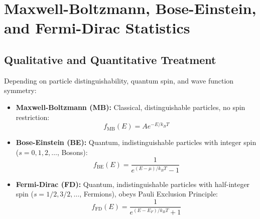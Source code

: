 \documentclass[12pt,a4paper]{article}
\begin{document}
\section{Maxwell-Boltzmann, Bose-Einstein, and Fermi-Dirac Statistics}

\subsection{Qualitative and Quantitative Treatment}

Depending on particle distinguishability, quantum spin, and wave function symmetry:

\begin{tcolorbox}[formulabox, title={\textbf{Three Distribution Functions}}]
\begin{itemize}[leftmargin=*, itemsep=3pt]
  \item \textbf{Maxwell-Boltzmann (MB):} Classical, distinguishable particles, no spin restriction:
  \begin{equation}
  f_{\text{MB}}(E) = A e^{-E / k_B T}
  \end{equation}
  \item \textbf{Bose-Einstein (BE):} Quantum, indistinguishable particles with integer spin ($s=0, 1, 2, \ldots$, Bosons):
  \begin{equation}
  f_{\text{BE}}(E) = \frac{1}{e^{(E-\mu)/k_B T} - 1}
  \end{equation}
  \item \textbf{Fermi-Dirac (FD):} Quantum, indistinguishable particles with half-integer spin ($s=1/2, 3/2, \ldots$, Fermions), obeys Pauli Exclusion Principle:
  \begin{equation}
  f_{\text{FD}}(E) = \frac{1}{e^{(E-E_F)/k_B T} + 1}
  \end{equation}
\end{itemize}
\end{tcolorbox}
\end{document}
